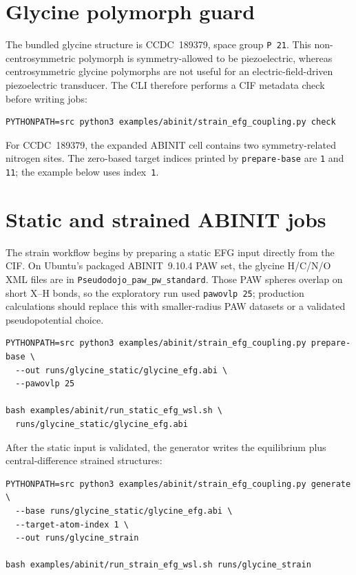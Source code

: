\documentclass[11pt,oneside]{report}
\newcommand{\code}[1]{{\small\nolinkurl{#1}}}
\newcommand{\cmd}[1]{\texttt{\small #1}}
\begin{document}
\section{Glycine polymorph guard}

The bundled glycine structure is CCDC~189379, space group \cmd{P 21}.  This
non-centrosymmetric polymorph is symmetry-allowed to be piezoelectric, whereas
centrosymmetric glycine polymorphs are not useful for an electric-field-driven
piezoelectric transducer.  The CLI therefore performs a CIF metadata check
before writing jobs:

\begin{lstlisting}
PYTHONPATH=src python3 examples/abinit/strain_efg_coupling.py check
\end{lstlisting}

For CCDC~189379, the expanded ABINIT cell contains two symmetry-related nitrogen
sites.  The zero-based target indices printed by \code{prepare-base} are
\code{1} and \code{11}; the example below uses index~\code{1}.

\section{Static and strained ABINIT jobs}

The strain workflow begins by preparing a static EFG input directly from the CIF.
On Ubuntu's packaged ABINIT~9.10.4 PAW set, the glycine H/C/N/O XML files are in
\code{Pseudodojo\_paw\_pw\_standard}.  Those PAW spheres overlap on short X--H
bonds, so the exploratory run used \cmd{pawovlp 25}; production calculations
should replace this with smaller-radius PAW datasets or a validated
pseudopotential choice.

\begin{lstlisting}
PYTHONPATH=src python3 examples/abinit/strain_efg_coupling.py prepare-base \
  --out runs/glycine_static/glycine_efg.abi \
  --pawovlp 25

bash examples/abinit/run_static_efg_wsl.sh \
  runs/glycine_static/glycine_efg.abi
\end{lstlisting}

After the static input is validated, the generator writes the equilibrium plus
central-difference strained structures:

\begin{lstlisting}
PYTHONPATH=src python3 examples/abinit/strain_efg_coupling.py generate \
  --base runs/glycine_static/glycine_efg.abi \
  --target-atom-index 1 \
  --out runs/glycine_strain

bash examples/abinit/run_strain_efg_wsl.sh runs/glycine_strain
\end{lstlisting}
\end{document}
